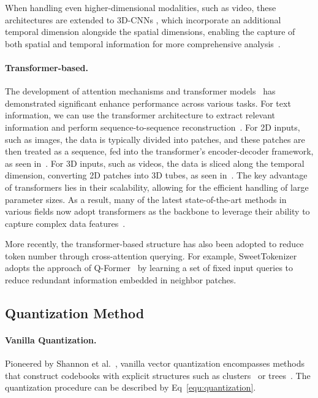 When handling even higher-dimensional modalities, such as video, these architectures are extended to 3D-CNNs
, which incorporate an additional temporal dimension alongside the spatial dimensions, enabling the capture of both spatial and temporal information for more comprehensive analysis~\cite{yu2023magvit}.


\paragraph{Transformer-based.}
The development of attention mechanisms and transformer models~\cite{dosovitskiy2020vit} has demonstrated significant enhance performance across various tasks. 
For text information, we can use the transformer architecture to extract relevant information and perform sequence-to-sequence reconstruction~\cite{sun2024learning}.
For 2D inputs, such as images, the data is typically divided into patches, and these patches are then treated as a sequence, fed into the transformer's encoder-decoder framework, as seen in~\cite{yu2021vit-vqgan}. 
For 3D inputs, such as videos, the data is sliced along the temporal dimension, converting 2D patches into 3D tubes, as seen in~\cite{wang2024omnitokenizer}.
The key advantage of transformers lies in their scalability, allowing for the efficient handling of large parameter sizes. As a result, many of the latest state-of-the-art methods in various fields now adopt transformers as the backbone to leverage their ability to capture complex data features~\cite{yu2024titok}.


More recently, the transformer-based structure has also been adopted to reduce token number through cross-attention querying.
For example, SweetTokenizer~\cite{tan2024sweettokenizer} adopts the approach of Q-Former~\cite{li2023blip} by learning a set of fixed input queries to reduce redundant information embedded in neighbor patches.


\subsection{Quantization Method}

\paragraph{Vanilla Quantization.}
Pioneered by Shannon et al.~\cite{shannon1959coding}, vanilla vector quantization encompasses methods that construct codebooks with explicit structures such as clusters~\cite{nister2006scalable} or trees~\cite{babenko2015tree}. 
The quantization procedure can be described by Eq~\eqref{equ:quantization}.

